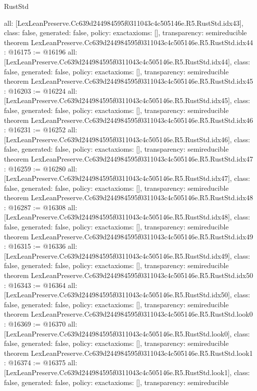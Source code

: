 \begin{lexlean}{RustStd}
\begin{coremodule}
{  all: [LexLeanPreserve.Cc639d244984595f0311043c4c505146e.R5.RustStd.idx43],
  class: false,
  generated: false,
  policy: exact{axioms: []},
  transparency: semireducible
}
theorem LexLeanPreserve.Cc639d244984595f0311043c4c505146e.R5.RustStd.idx44 : @16175 := @16196 {
  all: [LexLeanPreserve.Cc639d244984595f0311043c4c505146e.R5.RustStd.idx44],
  class: false,
  generated: false,
  policy: exact{axioms: []},
  transparency: semireducible
}
theorem LexLeanPreserve.Cc639d244984595f0311043c4c505146e.R5.RustStd.idx45 : @16203 := @16224 {
  all: [LexLeanPreserve.Cc639d244984595f0311043c4c505146e.R5.RustStd.idx45],
  class: false,
  generated: false,
  policy: exact{axioms: []},
  transparency: semireducible
}
theorem LexLeanPreserve.Cc639d244984595f0311043c4c505146e.R5.RustStd.idx46 : @16231 := @16252 {
  all: [LexLeanPreserve.Cc639d244984595f0311043c4c505146e.R5.RustStd.idx46],
  class: false,
  generated: false,
  policy: exact{axioms: []},
  transparency: semireducible
}
theorem LexLeanPreserve.Cc639d244984595f0311043c4c505146e.R5.RustStd.idx47 : @16259 := @16280 {
  all: [LexLeanPreserve.Cc639d244984595f0311043c4c505146e.R5.RustStd.idx47],
  class: false,
  generated: false,
  policy: exact{axioms: []},
  transparency: semireducible
}
theorem LexLeanPreserve.Cc639d244984595f0311043c4c505146e.R5.RustStd.idx48 : @16287 := @16308 {
  all: [LexLeanPreserve.Cc639d244984595f0311043c4c505146e.R5.RustStd.idx48],
  class: false,
  generated: false,
  policy: exact{axioms: []},
  transparency: semireducible
}
theorem LexLeanPreserve.Cc639d244984595f0311043c4c505146e.R5.RustStd.idx49 : @16315 := @16336 {
  all: [LexLeanPreserve.Cc639d244984595f0311043c4c505146e.R5.RustStd.idx49],
  class: false,
  generated: false,
  policy: exact{axioms: []},
  transparency: semireducible
}
theorem LexLeanPreserve.Cc639d244984595f0311043c4c505146e.R5.RustStd.idx50 : @16343 := @16364 {
  all: [LexLeanPreserve.Cc639d244984595f0311043c4c505146e.R5.RustStd.idx50],
  class: false,
  generated: false,
  policy: exact{axioms: []},
  transparency: semireducible
}
theorem LexLeanPreserve.Cc639d244984595f0311043c4c505146e.R5.RustStd.look0 : @16369 := @16370 {
  all: [LexLeanPreserve.Cc639d244984595f0311043c4c505146e.R5.RustStd.look0],
  class: false,
  generated: false,
  policy: exact{axioms: []},
  transparency: semireducible
}
theorem LexLeanPreserve.Cc639d244984595f0311043c4c505146e.R5.RustStd.look1 : @16374 := @16375 {
  all: [LexLeanPreserve.Cc639d244984595f0311043c4c505146e.R5.RustStd.look1],
  class: false,
  generated: false,
  policy: exact{axioms: []},
  transparency: semireducible
}
\end{coremodule}
\end{lexlean}
